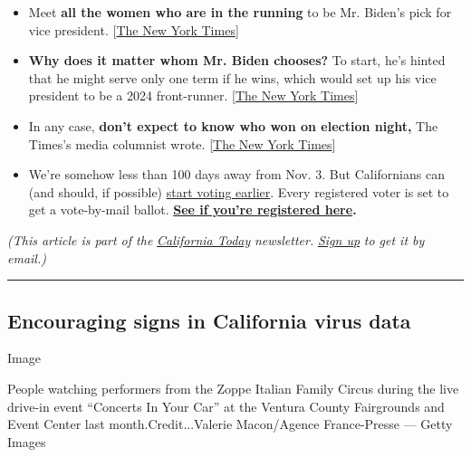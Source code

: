 \begin{itemize}
\item
  Meet \textbf{all the women who are in the running} to be Mr. Biden's
  pick for vice president.
  {[}\href{https://www.nytimes3xbfgragh.onion/interactive/2020/07/23/us/elections/vice-president-biden-kamala-harris-elizabeth-warren.html?}{The
  New York Times}{]}
\item
  \textbf{Why does it matter whom Mr. Biden chooses?} To start, he's
  hinted that he might serve only one term if he wins, which would set
  up his vice president to be a 2024 front-runner.
  {[}\href{https://www.nytimes3xbfgragh.onion/2020/05/03/us/politics/joe-biden-vice-president-pick.html?}{The
  New York Times}{]}
\item
  In any case, \textbf{don't expect to know who won on election night,}
  The Times's media columnist wrote.
  {[}\href{https://www.nytimes3xbfgragh.onion/2020/08/02/business/media/election-coverage.html?smid=tw-share}{The
  New York Times}{]}
\item
  We're somehow less than 100 days away from Nov. 3. But Californians
  can (and should, if possible)
  \href{https://www.nytimes3xbfgragh.onion/2020/04/10/us/california-mail-in-ballot-coronavirus.html}{start
  voting earlier}. Every registered voter is set to get a vote-by-mail
  ballot. \textbf{\href{https://voterstatus.sos.ca.gov/}{See if you're
  registered here}.}
\end{itemize}

\emph{(This article is part of the}
\href{https://www.nytimes3xbfgragh.onion/column/california-today}{\emph{California
Today}} \emph{newsletter.}
\href{https://www.nytimes3xbfgragh.onion/newsletters/california-today}{\emph{Sign
up}} \emph{to get it by email.)}

\begin{center}\rule{0.5\linewidth}{\linethickness}\end{center}

\hypertarget{encouraging-signs-in-california-virus-data}{%
\subsection{Encouraging signs in California virus
data}\label{encouraging-signs-in-california-virus-data}}

Image

People watching performers from the Zoppe Italian Family Circus during
the live drive-in event ``Concerts In Your Car'' at the Ventura County
Fairgrounds and Event Center last month.Credit...Valerie Macon/Agence
France-Presse --- Getty Images

